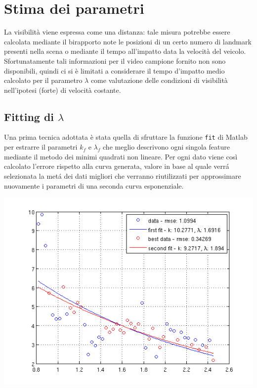 \documentclass[12pt]{report}
\begin{document}
\section{Stima dei parametri}

\noindent La visibilit\`a viene espressa come una distanza: tale misura potrebbe essere calcolata mediante il birapporto note le posizioni di un certo numero di landmark presenti nella scena o mediante il tempo all'impatto data la velocit\`a del veicolo. Sfortunatamente tali informazioni per il video campione fornito non sono disponibili, quindi ci si \`e limitati a considerare il tempo d'impatto medio calcolato per il parametro $\lambda$ come valutazione delle condizioni di visibilit\`a nell'ipotesi (forte) di velocit\`a costante.\\



\subsection{Fitting di $\lambda$}
\label{sect:fit}

\noindent Una prima tecnica adottata \`e stata quella di sfruttare la funzione \verb|fit| di Matlab per estrarre il parametri $k_f$ e $\lambda_f$ che meglio descrivono ogni singola feature mediante il metodo dei minimi quadrati non lineare. Per ogni dato viene cos\`i calcolato l'errore rispetto alla curva generata, valore in base al quale verr\'a selezionata la met\'a dei dati migliori che verranno riutilizzati per approssimare nuovamente i parametri di una seconda curva esponenziale.\\

\begin{center}
	\includegraphics[scale=0.7]{images/twoFits.png}
	\label{fig:twoFits}
\end{center}
\end{document}
